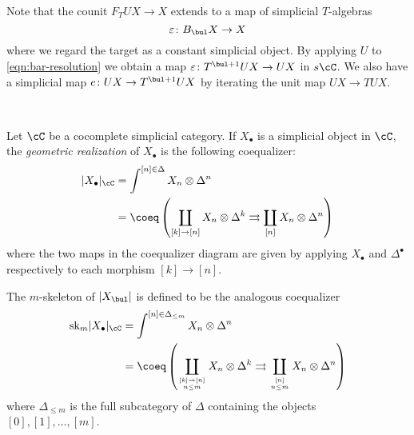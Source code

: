 \documentclass[leqno,oneside,english]{elsarticle}
\newcounter{enumisaved}
\newlength{\thmsaved}
\newlength{\thmnow}
\begin{document}
Note that the counit $F_TUX\rightarrow X$ extends to a map of
simplicial $T$-algebras
\begin{equation} \label{eqn:bar-resolution}
  \varepsilon\colon B_{\bul}X\rightarrow X
\end{equation}
where we regard the target as a constant simplicial object. 
By applying $U$ to \eqref{eqn:bar-resolution} we obtain a map
$\varepsilon\colon T^{\bul+1} UX\rightarrow UX$ in $s\cC$.
We also have a simplicial map $ e \colon UX\rightarrow T^{\bul+1}UX$ by iterating the unit map $UX\rightarrow TUX$.

{{    {}  \ifshowcomplete
  \ 
  {
\begin{defn*}\label{def:geometric-realization}
  Let $\cC$ be a cocomplete simplicial category. If $X_\bullet$ is a
  simplicial object in $\cC$, the \emph{geometric realization} of
  $X_\bullet$ is the following coequalizer:
  \begin{align*}
    |X_\bullet|_\cC &= \int^{[n]\in \Delta} X_{n}\otimes \Delta^n\\
    &= \coeq \left(
      \coprod_{[k]\rightarrow [n]}X_n\otimes
      \Delta^k\rightrightarrows \coprod_{[n]} X_n\otimes \Delta^n
    \right)
  \end{align*}
  where the two maps in the coequalizer diagram are given by applying
  $X_{\bullet}$  and $\Delta^{\bullet} $ respectively to each morphism
  $[k]\rightarrow [n]$. 
  
  The $m$-skeleton of $|X_{\bul}|$ is defined to be the analogous
  coequalizer
  \begin{align*}
    \mathrm{sk}_m|X_\bullet|_\cC &= \int^{[n]\in \Delta_{\leq m}} X_{n}\otimes \Delta^n\\
    &= \coeq \left(
      \coprod_{\genfrac{}{}{0pt}{}{[k]\rightarrow [n]}{ n\leq m}}X_n\otimes
      \Delta^k\rightrightarrows \coprod_{\genfrac{}{}{0pt}{}{[n]}{n\leq m}} X_n\otimes \Delta^n
    \right)
  \end{align*}
  where $\Delta_{\leq m}$ is the full subcategory of $\Delta$ containing
  the objects $[0],[1],\ldots,[m]$.
\end{defn*}

}
  {}
  \ 
  \ifthenelse{\lengthtest{\thmnow > \thmsaved}}{
    
    \setcounter{thm}{{\strip@pt{\thmsaved}}}  
  }{
    
  }
  \setcounter{enumi}{\theenumisaved}
    \else  \fi
}}{}
\end{document}
